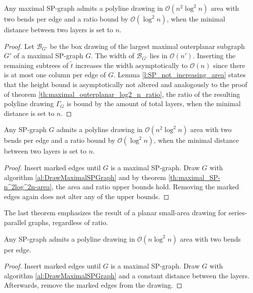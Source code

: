 
\begin{theorem}
	Any maximal SP-graph admits a polyline drawing in $\mathcal{O}(n^2 \log^2 n)$ area with two bends per edge and a ratio bound by $\mathcal{O}(\log^2 n)$, when the minimal distance between two layers is set to $n$. \label{th:maximal_SP-n^2log^2n-area}
\end{theorem}
\begin{proof}
	Let $\mathcal{B}_{G'}$ be the box drawing of the largest maximal outerplanar subgraph $G'$ of a maximal SP-graph $G$. The width of $\mathcal{B}_{G'}$ lies in $\mathcal{O}(n')$. Inserting the remaining subtrees of $\tilde{t}$ increases the width asymptotically to $\mathcal{O}(n)$ since there is at most one column per edge of $G$. Lemma \ref{l:SP_not_increasing_area} states that the height bound is asymptotically not altered and analogously to the proof of theorem \ref{th:maximal_outerplanar_log2_n_ratio}, the ratio of the resulting polyline drawing $\Gamma_G$ is bound by the amount of total layers, when the minimal distance is set to $n$.
\end{proof}
\begin{theorem}
	Any SP-graph $G$ admits a polyline drawing in $\mathcal{O}(n^2 \log^2 n)$ area with two bends per edge and a ratio bound by $\mathcal{O}(\log^2 n)$, when the minimal distance between two layers is set to $n$.
\end{theorem}
\begin{proof}
	Insert marked edges until $G$ is a maximal SP-graph. Draw $G$ with algorithm \ref{al:DrawMaximalSPGraph} and by theorem \ref{th:maximal_SP-n^2log^2n-area}, the area and ratio upper bounds hold. Removing the marked edges again does not alter any of the upper bounds.
\end{proof}

The last theorem emphasizes the result of a planar small-area drawing for series-parallel graphs, regardless of ratio.

\begin{theorem}
	Any SP-graph admits a polyline drawing in $\mathcal{O}(n \log^2 n)$ area with two bends per edge.
\end{theorem}
\begin{proof}
	Insert marked edges until $G$ is a maximal SP-graph. Draw $G$ with algorithm \ref{al:DrawMaximalSPGraph} and a constant distance between the layers. Afterwards, remove the marked edges from the drawing.
\end{proof}

